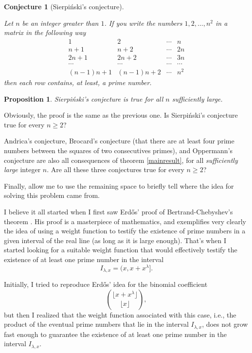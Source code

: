\documentclass[11pt]{amsart}
\newtheorem{proposition}[theorem]{Proposition}
\newtheorem{conjecture}[theorem]{Conjecture}
\numberwithin{equation}{section}
\newcommand{\pin}[1]{\lfloor #1 \rfloor}
\begin{document}
\begin{conjecture}[Sierpi\'nski's conjecture] \label{matrixconjecture}

Let $n$ be an integer greater than $1$. If you write the numbers $1, 2, \ldots, n^2$ in a matrix in the following way $$\begin{matrix}
1 & 2 & \cdots & n\\
n + 1 & n + 2 & \cdots & 2n\\
2n + 1 & 2n + 2 & \cdots & 3n\\
\cdots & \cdots & \cdots & \cdots\\
(n - 1)n + 1 & (n - 1)n + 2 & \cdots & n^2
\end{matrix}$$ then each row contains, at least, a prime number.

\end{conjecture}

\begin{proposition}

Sierpi\'nski's conjecture is true for all $n$ sufficiently large.

\end{proposition}

Obviously, the proof is the same as the previous one. Is Sierpi\'nski's conjecture true for every $n \geq 2$?

Andrica's conjecture, Brocard's conjecture (that there are at least four prime numbers between the squares of two consecutives primes), and Oppermann's conjecture are also all consequences of theorem \ref{mainresult}, for all \textit{sufficiently large} integer $n$. Are all these three conjectures true for every $n \geq 2$?

Finally, allow me to use the remaining space to briefly tell where the idea for solving this problem came from.

I believe it all started when I first saw Erd\H{o}s' proof of Bertrand-Chebyshev's theorem \cite{Erdos1}. His proof is a masterpiece of mathematics, and exemplifies very clearly the idea of using a weight function to testify the existence of prime numbers in a given interval of the real line (as long as it is large enough). That's when I started looking for a suitable weight function that would effectively testify the existence of at least one prime number in the interval $$I_{\lambda, x} = (x, x + x^\lambda].$$

Initially, I tried to reproduce Erd\H{o}s' idea for the binomial coefficient $$\binom{\pin{x + x^\lambda}}{\pin{x}},$$ but then I realized that the weight function associated with this case, i.e., the product of the eventual prime numbers that lie in the interval $I_{\lambda, x}$, does not grow fast enough to guarantee the existence of at least one prime number in the interval $I_{\lambda, x}$.
\end{document}
